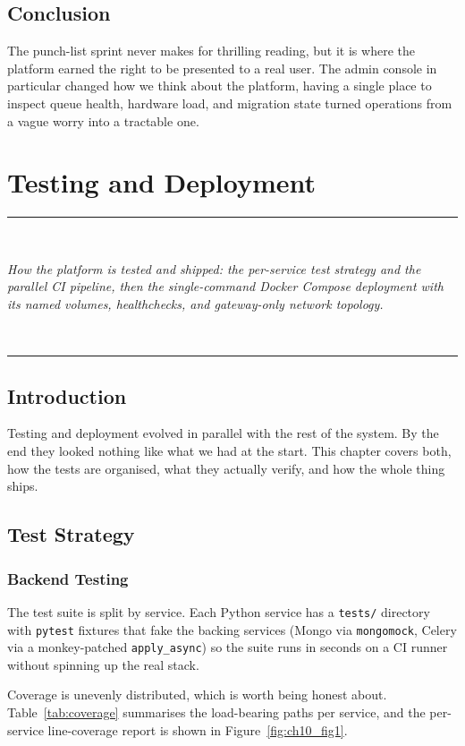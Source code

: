 \documentclass[12pt, a4paper, oneside]{report}
\newcommand{\chapterabstract}[1]{%
  \vspace*{1.2cm}%
  \begin{center}%
  \rule{0.45\textwidth}{0.4pt}\\[0.8em]%
  \begin{minipage}{0.82\textwidth}\centering\itshape\large #1\end{minipage}\\[0.8em]%
  \rule{0.45\textwidth}{0.4pt}%
  \end{center}%
  \vspace*{\fill}\clearpage}
\begin{document}
\section*{Conclusion}

The punch-list sprint never makes for thrilling reading, but it is
where the platform earned the right to be presented to a real user.
The admin console in particular changed how we think about the
platform, having a single place to inspect queue health, hardware
load, and migration state turned operations from a vague worry into
a tractable one.

\chapter{Testing and Deployment}
\chapterabstract{How the platform is tested and shipped: the per-service test
strategy and the parallel CI pipeline, then the single-command Docker Compose
deployment with its named volumes, healthchecks, and gateway-only network
topology.}

\section*{Introduction}

Testing and deployment evolved in parallel with the rest of the
system. By the end they looked nothing like what we had at the
start. This chapter covers both, how the tests are organised,
what they actually verify, and how the whole thing ships.

\section{Test Strategy}

\subsection{Backend Testing}

The test suite is split by service. Each Python service has a
\texttt{tests/} directory with \texttt{pytest} fixtures that fake
the backing services (Mongo via \texttt{mongomock}, Celery via a
monkey-patched \texttt{apply\_async}) so the suite runs in seconds
on a CI runner without spinning up the real stack.

Coverage is unevenly distributed, which is worth being honest about.
Table~\ref{tab:coverage} summarises the load-bearing paths per
service, and the per-service line-coverage report is shown in
Figure~\ref{fig:ch10_fig1}.
\end{document}
